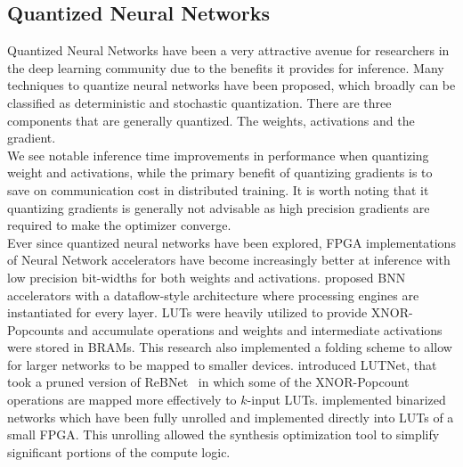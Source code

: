 \subsection{Quantized Neural Networks}
Quantized Neural Networks have been a very attractive avenue for researchers in the deep learning community due to the benefits it provides for inference. Many techniques to quantize neural networks have been proposed, which broadly can be classified as deterministic and stochastic quantization. There are three components that are generally quantized. The weights, activations and the gradient. \\
We see notable inference time improvements in performance when quantizing weight and activations, while the primary benefit of quantizing gradients is to save on communication cost in distributed training. It is worth noting that it quantizing gradients is generally not advisable as high precision gradients are required to make the optimizer converge. \\
Ever since quantized neural networks have been explored, FPGA implementations of Neural Network accelerators have become increasingly better at inference with low precision bit-widths for both weights and activations. \cite{umuroglu+:FPGA2017finn} proposed BNN accelerators with a dataflow-style architecture where processing engines are instantiated for every layer. LUTs were heavily utilized to provide XNOR-Popcounts and accumulate operations and weights and intermediate activations were stored in BRAMs. This research also implemented a folding scheme to allow for larger networks to be mapped to smaller devices. \cite{wang2019lutnet} introduced LUTNet, that took a pruned version of ReBNet~\cite{ghasemzadeh2018rebnet} in which some of the XNOR-Popcount operations are mapped more effectively to $k$-input LUTs. \cite{murovivc2019massively} implemented binarized networks which have been fully unrolled and implemented directly into LUTs of a small FPGA. This unrolling allowed the synthesis optimization tool to simplify significant portions of the compute logic. \\

